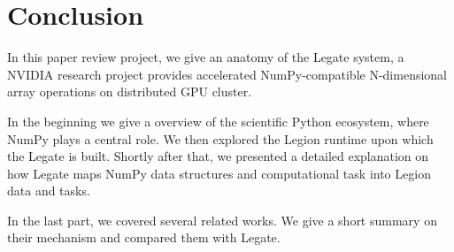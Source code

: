 \documentclass{article}
\newenvironment{newSecNoNP}[1]{
	\section{#1}
	\lhead{#1}
}{}
\begin{document}
\begin{newSecNoNP}{Conclusion}
	In this paper review project, we give an anatomy of the Legate system, a NVIDIA research project provides accelerated NumPy-compatible N-dimensional array operations on distributed GPU cluster.\par
	In the beginning we give a overview of the scientific Python ecosystem, where NumPy plays a central role.
	We then explored the Legion runtime upon which the Legate is built.
	Shortly after that, we presented a detailed explanation on how Legate maps NumPy data structures and computational task into Legion data and tasks.\par
	In the last part, we covered several related works.
	We give a short summary on their mechanism and compared them with Legate.
\end{newSecNoNP}
\printbibliography{}
\appendix


\end{document}
